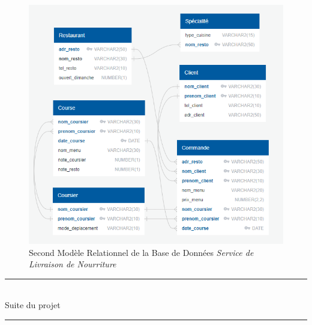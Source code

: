 \documentclass[french]{article}
\begin{document}
            \begin{figure}[ht] %
                \centering
                \includegraphics[scale = 0.7]{Image/modele_relationnel_2.png}
                \caption{Second Modèle Relationnel de la Base de Données \emph{Service de Livraison de Nourriture}}
                \label{image_modele_relationnel_2}
            \end{figure}

        \begin{center}
            \rule{12cm}{0.1pt}\\[10px] 
            Suite du projet\\[5px]
            \rule{12cm}{0.1pt}\\[10px]
        \end{center}
        
\end{document}
